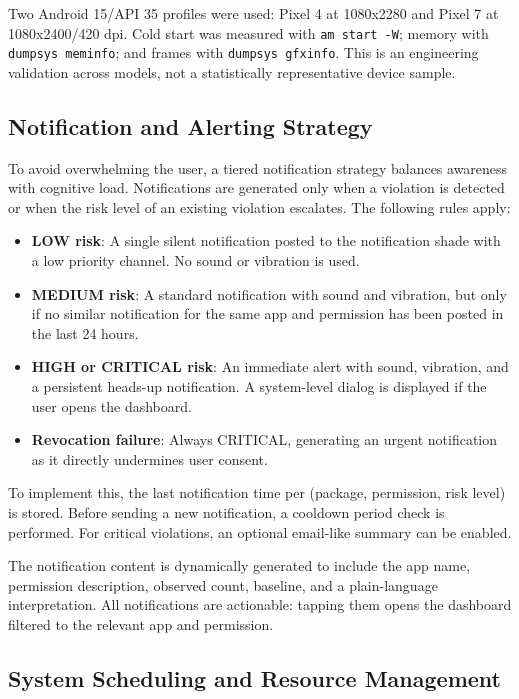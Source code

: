 Two Android 15/API 35 profiles were used: Pixel 4 at 1080x2280 and Pixel 7 at 1080x2400/420 dpi. Cold start was measured with \texttt{am start -W}; memory with \texttt{dumpsys meminfo}; and frames with \texttt{dumpsys gfxinfo}. This is an engineering validation across models, not a statistically representative device sample.

\subsection{Notification and Alerting Strategy}

To avoid overwhelming the user, a tiered notification strategy balances awareness with cognitive load. Notifications are generated only when a violation is detected or when the risk level of an existing violation escalates. The following rules apply:

\begin{itemize}
\item \textbf{LOW risk}: A single silent notification posted to the notification shade with a low priority channel. No sound or vibration is used.
\item \textbf{MEDIUM risk}: A standard notification with sound and vibration, but only if no similar notification for the same app and permission has been posted in the last 24 hours.
\item \textbf{HIGH or CRITICAL risk}: An immediate alert with sound, vibration, and a persistent heads-up notification. A system-level dialog is displayed if the user opens the dashboard.
\item \textbf{Revocation failure}: Always CRITICAL, generating an urgent notification as it directly undermines user consent.
\end{itemize}

To implement this, the last notification time per (package, permission, risk level) is stored. Before sending a new notification, a cooldown period check is performed. For critical violations, an optional email-like summary can be enabled.

The notification content is dynamically generated to include the app name, permission description, observed count, baseline, and a plain-language interpretation. All notifications are actionable: tapping them opens the dashboard filtered to the relevant app and permission.

\subsection{System Scheduling and Resource Management}

